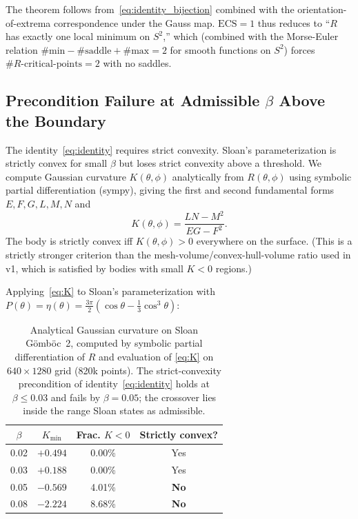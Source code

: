 \documentclass[11pt,a4paper]{article}
\begin{document}
The theorem follows from~\eqref{eq:identity_bijection} combined with
the orientation-of-extrema correspondence under the Gauss map.
$\mathrm{ECS} = 1$ thus reduces to ``$R$ has exactly one local
minimum on $S^2$,'' which (combined with the Morse-Euler relation
$\#\text{min} - \#\text{saddle} + \#\text{max} = 2$ for smooth
functions on $S^2$) forces $\#R\text{-critical-points} = 2$ with
no saddles.

\subsection{Precondition Failure at Admissible $\beta$ Above the Boundary}
\label{sec:precondition_failure}

The identity~\eqref{eq:identity} requires strict convexity. Sloan's
parameterization is strictly convex for small $\beta$ but loses
strict convexity above a threshold. We compute Gaussian curvature
$K(\theta,\phi)$ analytically from $R(\theta,\phi)$ using symbolic
partial differentiation (sympy), giving the first and second
fundamental forms $E, F, G, L, M, N$ and
\begin{equation}
K(\theta,\phi) = \frac{LN - M^2}{EG - F^2}.
\label{eq:K}
\end{equation}
The body is strictly convex iff $K(\theta,\phi) > 0$ everywhere on
the surface. (This is a strictly stronger criterion than the
mesh-volume/convex-hull-volume ratio used in v1, which is satisfied
by bodies with small $K<0$ regions.)

Applying~\eqref{eq:K} to Sloan's parameterization with
$P(\theta) = \eta(\theta) = \tfrac{3\pi}{2}(\cos\theta -
\tfrac{1}{3}\cos^3\theta)$:

\begin{table}[h]
\centering
\caption{Analytical Gaussian curvature on Sloan G\"omb\"oc~2,
computed by symbolic partial differentiation of $R$ and evaluation
of \eqref{eq:K} on $640 \times 1280$ grid (820k points). The
strict-convexity precondition of identity~\eqref{eq:identity}
holds at $\beta \le 0.03$ and fails by $\beta = 0.05$; the
crossover lies inside the range Sloan states as admissible.}
\label{tab:sloan_K}
\begin{tabular}{cccc}
\toprule
$\beta$ & $K_{\min}$ & Frac. $K<0$ & Strictly convex? \\
\midrule
0.02 & $+0.494$ & 0.00\%  & Yes \\
0.03 & $+0.188$ & 0.00\%  & Yes \\
0.05 & $-0.569$ & 4.01\%  & \textbf{No} \\
0.08 & $-2.224$ & 8.68\%  & \textbf{No} \\
\bottomrule
\end{tabular}
\end{table}
\end{document}

